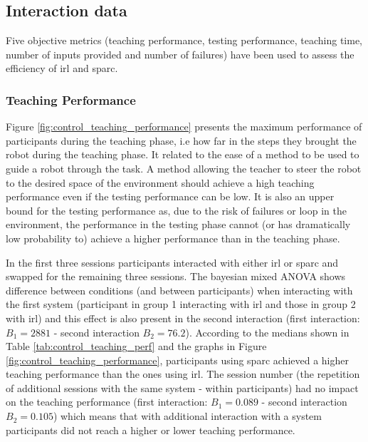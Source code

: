 \subsection{Interaction data}

Five objective metrics (teaching performance, testing performance, teaching time, number of inputs provided and number of failures) have been used to assess the efficiency of \gls{irl} and \gls{sparc}. 

\subsubsection{Teaching Performance}

Figure \ref{fig:control_teaching_performance} presents the maximum performance of participants during the teaching phase, i.e how far in the steps they brought the robot during the teaching phase. It related to the ease of a method to be used to guide a robot through the task. A method allowing the teacher to steer the robot to the desired space of the environment should achieve a high teaching performance even if the testing performance can be low. It is also an upper bound for the testing performance as, due to the risk of failures or loop in the environment, the performance in the testing phase cannot (or has dramatically low probability to) achieve a higher performance than in the teaching phase.

In the first three sessions participants interacted with either \gls{irl} or \gls{sparc} and swapped for the remaining three sessions. The bayesian mixed ANOVA shows difference between conditions (and between participants) when interacting with the first system (participant in group 1 interacting with \gls{irl} and those in group 2 with \gls{irl}) and this effect is also present in the second interaction (first interaction:$B_1=2881$ - second interaction $B_2 = 76.2$). According to the medians shown in Table \ref{tab:control_teaching_perf} and the graphs in Figure \ref{fig:control_teaching_performance}, participants using \gls{sparc} achieved a higher teaching performance than the ones using \gls{irl}. The session number (the repetition of additional sessions with the same system - within participants) had no impact on the teaching performance (first interaction: $B_1=0.089$ - second interaction $B_2=0.105$) which means that with additional interaction with a system participants did not reach a higher or lower teaching performance.

